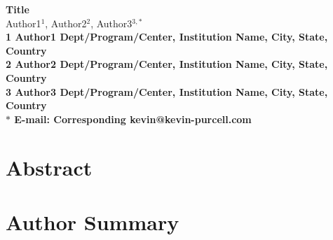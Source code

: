 \documentclass[10pt]{article}
\date{}
\begin{document}
\begin{flushleft}
{\Large
\textbf{Title}
}
\\
Author1$^{1}$, 
Author2$^{2}$, 
Author3$^{3,\ast}$
\\
\bf{1} Author1 Dept/Program/Center, Institution Name, City, State, Country
\\
\bf{2} Author2 Dept/Program/Center, Institution Name, City, State, Country
\\
\bf{3} Author3 Dept/Program/Center, Institution Name, City, State, Country
\\
$\ast$ E-mail: Corresponding kevin@kevin-purcell.com
\end{flushleft}

\section*{Abstract}

\section*{Author Summary}
\end{document}
